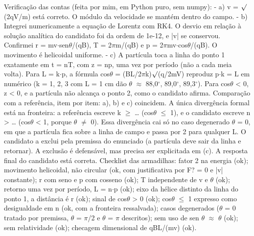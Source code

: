 \documentclass{article}%
\begin{document}
\newline%
Verificação das contas (feita por mim, em Python puro, sem numpy):\newline%
{-} a) v = $\surd$(2qV/m) está correto. O módulo da velocidade se mantém dentro do campo.\newline%
{-} b) Integrei numericamente a equação de Lorentz com RK4. O desvio em relação à solução analítica do candidato foi da ordem de 1e{-}12, e |v| se conservou. Confirmei r = mv$\cdot$sen$\theta$/(qB), T = 2$\pi$m/(qB) e p = 2$\pi$mv$\cdot$cos$\theta$/(qB). O movimento é helicoidal uniforme.\newline%
{-} c) A partícula toca a linha do ponto 1 exatamente em t = nT, com z = np, uma vez por período (não a cada meia volta). Para L = k$\cdot$p, a fórmula cos$\theta$ = (BL/2$\pi$k)$\surd$(q/2mV) reproduz p$\cdot$k = L em numérico (k = 1, 2, 3 com L = 1 cm dão $\theta$ $\approx$ 88,0$^\circ$, 89,0$^\circ$, 89,3$^\circ$). Para cos$\theta$ < 0, z < 0, e a partícula não alcança o ponto 2, como o candidato afirma.\newline%
\newline%
Comparação com a referência, item por item: a), b) e c) coincidem. A única divergência formal está na fronteira: a referência escreve k $\geq$ \ldots{} (cos$\theta$ $\leq$ 1), e o candidato escreve n > \ldots{} (cos$\theta$ < 1, porque $\theta$ $\neq$ 0). Essa divergência cai só no caso degenerado $\theta$ = 0, em que a partícula fica sobre a linha de campo e passa por 2 para qualquer L. O candidato a exclui pela premissa do enunciado (a partícula deve sair da linha e retornar). A exclusão é defensável, mas precisa ser explicitada em (c). A resposta final do candidato está correta.\newline%
\newline%
Checklist das armadilhas: fator 2 na energia (ok); movimento helicoidal, não circular (ok, com justificativa por F? = 0 e |v| constante); r com seno e p com cosseno (ok); T independente de v e $\theta$ (ok); retorno uma vez por período, L = n$\cdot$p (ok); eixo da hélice distinto da linha do ponto 1, a distância é r (ok); sinal de cos$\theta$ > 0 (ok); cos$\theta$ $\leq$ 1 expresso como desigualdade em n (ok, com a fronteira ressalvada); casos degenerados ($\theta$ = 0 tratado por premissa, $\theta$ = $\pi$/2 e $\theta$ = $\pi$ descritos); sem uso de sen $\theta$ $\approx$ $\theta$ (ok); sem relatividade (ok); checagem dimensional de qBL/(mv) (ok).\newline%
\newline%
\end{document}
